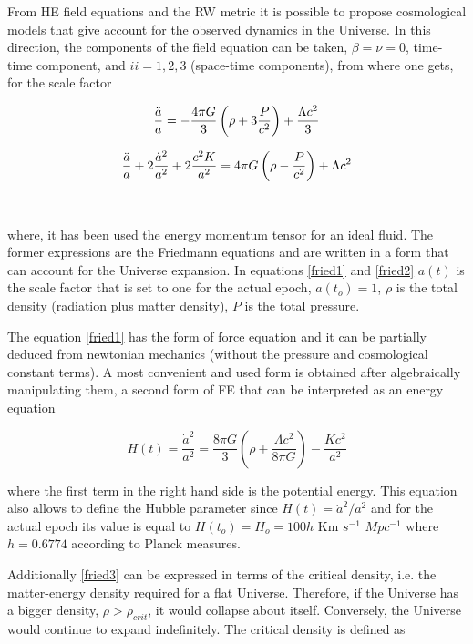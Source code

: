 From HE field equations and the RW metric it is possible to propose 
cosmological models that give account for the observed dynamics
in the Universe. In this direction, the components of the 
field equation can be taken, $\beta=\nu= 0$, time-time component,
and $ii=1,2,3$ (space-time components), from where one gets, for the scale
factor

\begin{equation}
\frac{\ddot{a}}{a} = -\frac{4\pi G}{3 }\left( \rho + 3 \frac{P}{c^2} \right)+\frac{\Lambda c^2}{3} 
\label{fried1}
\end{equation}

\begin{equation}
\frac{\ddot{a}}{a}+2\frac{\dot{a}^2}{a^2}+2\frac{c^2 K}{a^2} = 4\pi G\left( \rho-\frac{P}{c^2}\right)+\Lambda c^2
\label{fried2}
\end{equation}

\

where, it has been used the energy momentum tensor for an ideal fluid. 
The former expressions are the Friedmann equations and are written in a form
that can account for the Universe expansion. In equations \ref{fried1} and \ref{fried2}
$a(t)$ is the scale factor that is set to one for the actual epoch,
$a(t_o)=1$, $\rho$ is the total density (radiation plus matter density), $P$ is
the total pressure.  

The equation \ref{fried1} has the form of force equation and it can
be partially deduced from newtonian mechanics (without the pressure
and cosmological constant terms). A most convenient and used form
is obtained after algebraically manipulating them, a second form of 
FE that can be interpreted as an energy equation

\begin{equation}
H(t)=\frac{\dot{a}^2}{a^2}=\frac{8 \pi G}{3}\left(\rho+\frac{\Lambda c^2}{8\pi G}\right) -\frac{Kc^2}{a^2}
\label{fried3}
\end{equation}

where the first term in the right hand side is the potential energy. 
This equation also allows to define the Hubble parameter since $H(t)=\dot{a}^2/a^2$ and for the 
actual epoch its value is equal to $H(t_o)=H_o = 100h$ Km $s^{-1}$ $Mpc^{-1}$ where $h=0.6774$
according to Planck measures. 

Additionally \ref{fried3} can be expressed in terms of the critical
density, i.e. the matter-energy density required for a flat Universe.
Therefore, if the Universe has a bigger density,
$\rho > \rho_{crit}$, it would collapse about itself. Conversely, the Universe would
continue to expand indefinitely. The critical density is defined as

